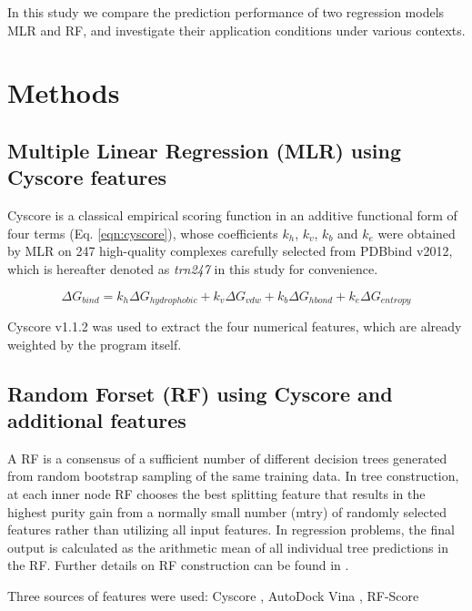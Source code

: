 \documentclass[journal=jacsat,manuscript=article]{achemso}
\begin{document}
In this study we compare the prediction performance of two regression models MLR and RF, and investigate their application conditions under various contexts.

\section{Methods}


\subsection{Multiple Linear Regression (MLR) using Cyscore features}

Cyscore is a classical empirical scoring function in an additive functional form of four terms (Eq. \ref{eqn:cyscore}), whose coefficients $k_h$, $k_v$, $k_b$ and $k_e$ were obtained by MLR on 247 high-quality complexes carefully selected from PDBbind v2012, which is hereafter denoted as \textit{trn247} in this study for convenience.

\begin{equation}
\Delta G_{bind} = k_h\Delta G_{hydrophobic} + k_v\Delta G_{vdw} + k_b\Delta G_{hbond} + k_e\Delta G_{entropy}
\label{eqn:cyscore}
\end{equation}

Cyscore v1.1.2 was used to extract the four numerical features, which are already weighted by the program itself.

\subsection{Random Forset (RF) using Cyscore and additional features}

A RF \cite{1309} is a consensus of a sufficient number of different decision trees generated from random bootstrap sampling of the same training data. In tree construction, at each inner node RF chooses the best splitting feature that results in the highest purity gain from a normally small number (mtry) of randomly selected features rather than utilizing all input features. In regression problems, the final output is calculated as the arithmetic mean of all individual tree predictions in the RF. Further details on RF construction can be found in \cite{564,1362}.

Three sources of features were used: Cyscore \cite{1372}, AutoDock Vina \cite{595}, RF-Score \cite{564}
\end{document}
